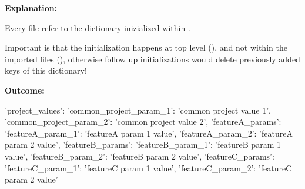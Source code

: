 \vspace{2ex}

\textbullet {}


\vspace{2ex}

\textbullet {}


\vspace{2ex}

\textbf{Explanation:}

\vspace{2ex}

Every  file refer to the dictionary inizialized within .

Important is that the initialization  happens at top level (),
and not within the imported files (), otherwise follow up initializations would delete
previously added keys of this dictionary!

\vspace{2ex}

\textbf{Outcome:}

\vspace{2ex}

\begin{pythonlog}
{'project_values': {'common_project_param_1': 'common project value 1',
                    'common_project_param_2': 'common project value 2',
                    'featureA_params': {'featureA_param_1': 'featureA param 1 value',
                                        'featureA_param_2': 'featureA param 2 value'},
                    'featureB_params': {'featureB_param_1': 'featureB param 1 value',
                                        'featureB_param_2': 'featureB param 2 value'},
                    'featureC_params': {'featureC_param_1': 'featureC param 1 value',
                                        'featureC_param_2': 'featureC param 2 value'}}}
\end{pythonlog}


